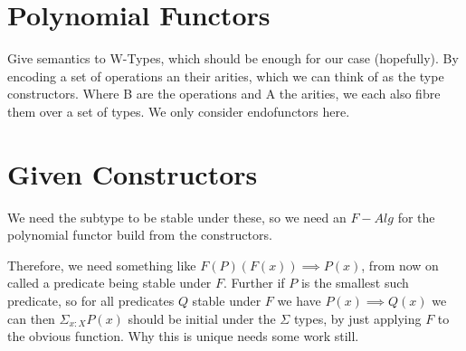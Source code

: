 \documentclass{article}
\begin{document}
\section{Polynomial Functors}

Give semantics to W-Types, which should be enough for our case (hopefully). By encoding a set of operations an their arities, which we can think of as the type constructors. Where B are the operations and A the arities, we each also fibre them over a set of types. We only consider endofunctors here.

\begin{center}
\end{center}

\section{Given Constructors}

We need the subtype to be stable under these, so we need an $F-Alg$ for the polynomial functor build from the constructors.

\begin{center}
\end{center}

Therefore, we need something like $F(P)(F(x)) \implies P(x)$, from now on called a predicate being stable under $F$. Further if $P$ is the smallest such predicate, so for all predicates $Q$ stable under $F$ we have $P(x) \implies Q(x)$ we can then $\Sigma_{x:X} P(x)$ should be initial under the $\Sigma$ types, by just applying $F$ to the obvious function. Why this is unique needs some work still.

\begin{center}
\end{center}
\end{document}
